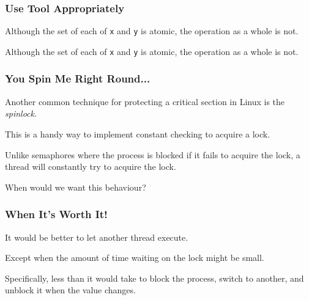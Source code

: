 \begin{frame}
	\frametitle{Use Tool Appropriately}

	Although the set of each of \texttt{x} and \texttt{y} is atomic, the operation as a whole is not.

	Although the set of each of \texttt{x} and \texttt{y} is atomic, the operation as a whole is not.

\end{frame}


\begin{frame}
	\frametitle{You Spin Me Right Round...}

	Another common technique for protecting a critical section in Linux is the \textit{spinlock}.

	This is a handy way to implement constant checking to acquire a lock.

	Unlike semaphores where the process is blocked if it fails to acquire the lock, a thread will constantly try to acquire the lock.

	When would we want this behaviour?

\end{frame}


\begin{frame}
	\frametitle{When It's Worth It!}

	It would be better to let another thread execute.

	Except when the amount of time waiting on the lock might be small.

	Specifically, less than it would take to block the process, switch to another, and unblock it when the value changes.


\end{frame}

